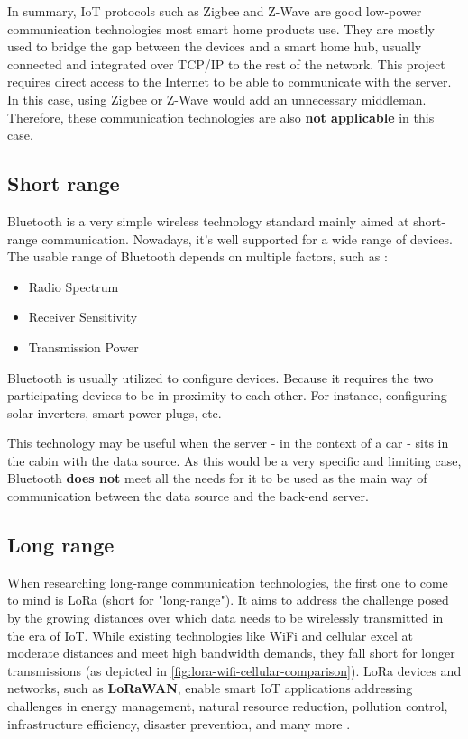 \documentclass[FM,BP,EN,fonts]{tulthesis}
\begin{document}
In summary, IoT protocols such as Zigbee and Z-Wave are good low-power communication technologies most smart home products use. They are mostly used to bridge the gap between the devices and a smart home hub, usually connected and integrated over TCP/IP to the rest of the network. This project requires direct access to the Internet to be able to communicate with the server. In this case, using Zigbee or Z-Wave would add an unnecessary middleman. Therefore, these communication technologies are also \textbf{not applicable} in this case.

\subsection{Short range}
Bluetooth is a very simple wireless technology standard mainly aimed at short-range communication. Nowadays, it's well supported for a wide range of devices. The usable range of Bluetooth depends on multiple factors, such as \cite{bluetooth-range}:
\begin{itemize}
    \item Radio Spectrum
    \item Receiver Sensitivity
    \item Transmission Power
\end{itemize}

Bluetooth is usually utilized to configure devices. Because it requires the two participating devices to be in proximity to each other. For instance, configuring solar inverters, smart power plugs, etc.

This technology may be useful when the server - in the context of a car - sits in the cabin with the data source. As this would be a very specific and limiting case, Bluetooth \textbf{does not} meet all the needs for it to be used as the main way of communication between the data source and the back-end server.

\subsection{Long range}
When researching long-range communication technologies, the first one to come to mind is LoRa (short for "long-range"). It aims to address the challenge posed by the growing distances over which data needs to be wirelessly transmitted in the era of IoT. While existing technologies like WiFi and cellular excel at moderate distances and meet high bandwidth demands, they fall short for longer transmissions (as depicted in \autoref{fig:lora-wifi-cellular-comparison}). LoRa devices and networks, such as \textbf{LoRaWAN}, enable smart IoT applications addressing challenges in energy management, natural resource reduction, pollution control, infrastructure efficiency, disaster prevention, and many more \cite{what-is-lora}. 
\end{document}
